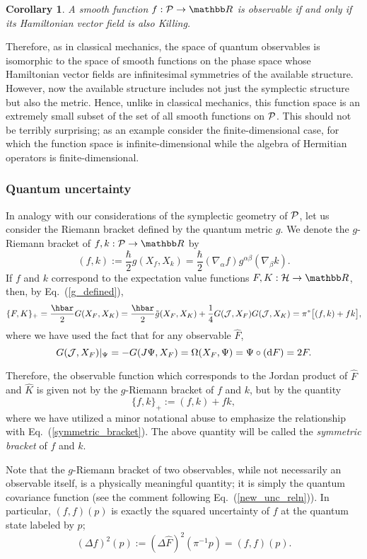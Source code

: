 \documentclass[12pt,aps,eqsecnum,tighten,nofootinbib]{revtex4-2}
\def\be{\begin{equation}}
\def\ee{\end{equation}}
\def\a{\alpha}
\def\b{\beta}
\def\d{{\mathrm d}}
\def\grad{\nabla}
\def\H{{\cal H}}
\def\P{{\cal P}}
\def\W{\Omega}
\def\J{{\cal J}}
\newcommand{\eqn}[1]{Eq.~(\ref{#1})}
\newcommand{\hvf}[1]{{X_{#1}}}
\newtheorem{cor}{Corollary}
\def\R{\mathbb R}
\begin{document}
%
\begin{cor}
A smooth function $f:\P\rightarrow\R$ is observable if and only if its
Hamiltonian vector field is also Killing.
\end{cor}
%
Therefore, as in classical mechanics, the space of quantum observables
is isomorphic to the space of smooth functions on the phase space
whose Hamiltonian vector fields are infinitesimal symmetries of the
available structure.  However, now the available structure includes
not just the symplectic structure but also the metric. Hence, unlike
in classical mechanics, this function space is an extremely small
subset of the set of all smooth functions on $\P$.  This should not be
terribly surprising; as an example consider the finite-dimensional
case, for which the function space is infinite-dimensional while the
algebra of Hermitian operators is finite-dimensional.


\subsubsection{Quantum uncertainty}

In analogy with our considerations of the symplectic geometry of $\P$,
let us consider the Riemann bracket defined by the quantum metric $g$.
We denote the $g$-Riemann bracket of $f,k : \P \rightarrow \R$ by
%
\be
( f, k ) := \frac{\hbar}{2} g( \hvf{f}, \hvf{k} )
	  = \frac{\hbar}{2} (\grad_\a f) g^{\a\b} (\grad_\b k).
\ee
%
If $f$ and $k$ correspond to the expectation value functions
$F, K : \H \rightarrow \R$, then, by \eqn{g_defined},
%
\be
\{ F, K \}_+  = \frac{\hbar}{2} G( \hvf{F}, \hvf{K} )
= \frac{\hbar}{2} \tilde{g} ( \hvf{F}, \hvf{K})
+ \frac{1}{4} G( \J,\hvf{F} ) G( \J,\hvf{K} )
= \pi^* \big[ (f,k) + fk \big],
\ee
%
where we have used the fact that for any observable $\hat{F}$,
%
\be
G(\J, \hvf{F})|_\Psi = - G(J\Psi, \hvf{F}) 
= \W( \hvf{F}, \Psi ) = \Psi \circ (\d F) = 2F.
\ee
%

Therefore, the observable function which corresponds to the Jordan
product of $\hat{F}$ and $\hat{K}$ is given not by the $g$-Riemann
bracket of $f$ and $k$, but by the quantity
%
\be \label{symmetric_bracket2}
\{ f, k \}_+  := ( f, k) + fk,		
\ee
%
where we have utilized a minor notational abuse to emphasize the
relationship with \eqn{symmetric_bracket}.  The above quantity will be
called the {\em symmetric bracket} of $f$ and $k$.

Note that the $g$-Riemann bracket of two observables, while not
necessarily an observable itself, is a physically meaningful quantity;
it is simply the quantum covariance function (see the comment
following \eqn{new_unc_reln}).  In particular, $(f, f)(p)$ is exactly
the squared uncertainty of $f$ at the quantum state labeled by $p$;
%
\be \label{new_uncertainty}
(\Delta f)^2(p) := (\Delta \hat{F})^2(\pi^{-1}p) = (f, f)(p).
\ee
%
\end{document}
